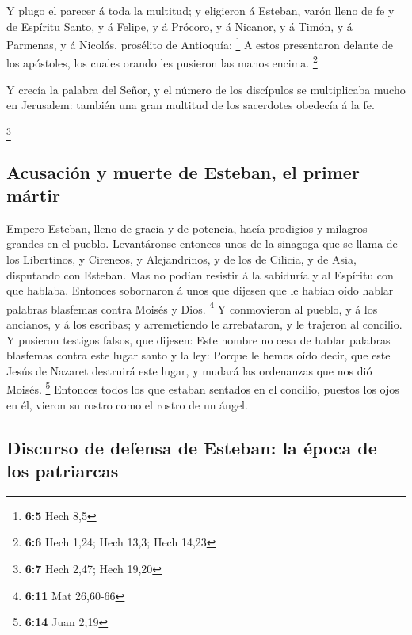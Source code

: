  Y plugo el parecer á toda la multitud; y eligieron á
Esteban, varón lleno de fe y de Espíritu Santo, y á Felipe, y á Prócoro,
y á Nicanor, y á Timón, y á Parmenas, y á Nicolás, prosélito de
Antioquía: \footnote{\textbf{6:5} Hech 8,5}  A estos
presentaron delante de los apóstoles, los cuales orando les pusieron las
manos encima. \footnote{\textbf{6:6} Hech 1,24; Hech 13,3; Hech 14,23}

 Y crecía la palabra del Señor, y el número de los
discípulos se multiplicaba mucho en Jerusalem: también una gran multitud
de los sacerdotes obedecía á la fe.

\footnote{\textbf{6:7} Hech 2,47; Hech 19,20}

\hypertarget{acusaciuxf3n-y-muerte-de-esteban-el-primer-muxe1rtir}{%
\subsection{Acusación y muerte de Esteban, el primer
mártir}\label{acusaciuxf3n-y-muerte-de-esteban-el-primer-muxe1rtir}}

 Empero Esteban, lleno de gracia y de potencia, hacía
prodigios y milagros grandes en el pueblo.  Levantáronse
entonces unos de la sinagoga que se llama de los Libertinos, y Cireneos,
y Alejandrinos, y de los de Cilicia, y de Asia, disputando con Esteban.
 Mas no podían resistir á la sabiduría y al Espíritu con
que hablaba.  Entonces sobornaron á unos que dijesen que
le habían oído hablar palabras blasfemas contra Moisés y Dios.
\footnote{\textbf{6:11} Mat 26,60-66}  Y conmovieron al
pueblo, y á los ancianos, y á los escribas; y arremetiendo le
arrebataron, y le trajeron al concilio.  Y pusieron
testigos falsos, que dijesen: Este hombre no cesa de hablar palabras
blasfemas contra este lugar santo y la ley:  Porque le
hemos oído decir, que este Jesús de Nazaret destruirá este lugar, y
mudará las ordenanzas que nos dió Moisés. \footnote{\textbf{6:14} Juan
  2,19}  Entonces todos los que estaban sentados en el
concilio, puestos los ojos en él, vieron su rostro como el rostro de un
ángel.

\hypertarget{discurso-de-defensa-de-esteban-la-uxe9poca-de-los-patriarcas}{%
\subsection{Discurso de defensa de Esteban: la época de los
patriarcas}\label{discurso-de-defensa-de-esteban-la-uxe9poca-de-los-patriarcas}}

